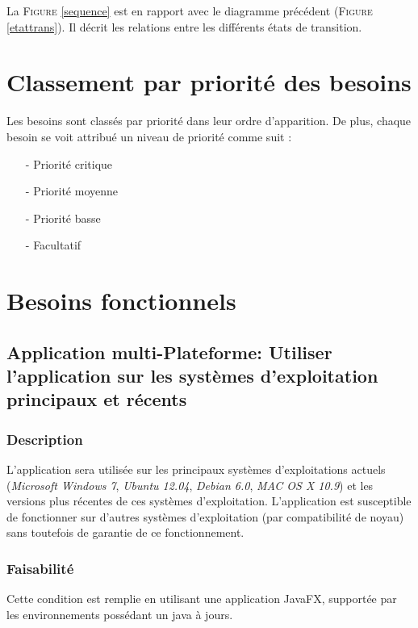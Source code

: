  La \textsc{Figure} \ref{sequence} est en rapport avec le diagramme précédent (\textsc{Figure} \ref{etattrans}). Il décrit les relations entre les différents états de transition.

\section{Classement par priorité des besoins}\label{priorite}

Les besoins sont classés par priorité dans leur ordre d'apparition. De plus, chaque besoin se voit attribué un niveau de priorité comme suit :

\begin{itemize}
 \item[-] Priorité critique
 \item[-] Priorité moyenne
 \item[-] Priorité basse
 \item[-] Facultatif
\end{itemize}

\section{Besoins fonctionnels}\label{besoins_fonctionnels}

\subsection{Application multi-Plateforme: Utiliser l’application sur les systèmes d’exploitation principaux et récents}\label{systems}

\subsubsection{Description}

L’application sera utilisée sur les principaux systèmes d’exploitations actuels (\textit{Microsoft Windows 7}, \textit{Ubuntu 12.04}, \textit{Debian 6.0}, \textit{MAC OS X 10.9}) et les versions plus récentes de ces systèmes d’exploitation.
L’application est susceptible de fonctionner sur d’autres systèmes d’exploitation (par compatibilité de noyau) sans toutefois de garantie de ce fonctionnement.

\subsubsection{Faisabilité}

Cette condition est remplie en utilisant une application JavaFX, supportée par les environnements possédant un java à jours.

